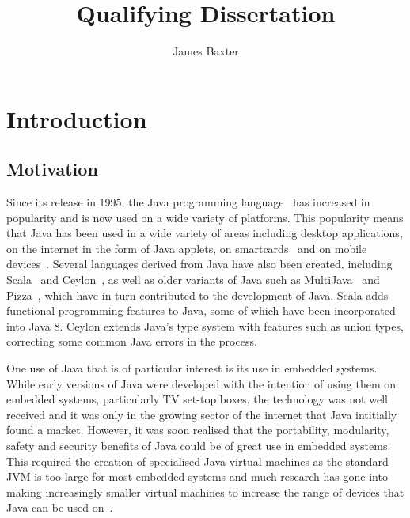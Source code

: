 \documentclass[a4paper,12pt]{article}
\title{Qualifying Dissertation}
\author{James Baxter}
\date{}
\begin{document}
\maketitle

\section{Introduction}


\subsection{Motivation}

Since its release in 1995, the Java programming language~\cite{gosling2013} has
increased in popularity and is now used on a wide variety of platforms.  This
popularity means that Java has been used in a wide variety of areas including
desktop applications, on the internet in the form of Java applets, on
smartcards~\cite{chen2000} and on mobile devices~\cite{oracle2014}.  Several
languages derived from Java have also been created, including
Scala~\cite{lausanne2015} and Ceylon~\cite{redhat2015}, as well as older
variants of Java such as MultiJava~\cite{clifton2006} and
Pizza~\cite{odersky1997}, which have in turn contributed to the development of
Java. Scala adds functional programming features to Java, some of which have
been incorporated into Java 8. Ceylon extends Java's type system with features
such as union types, correcting some common Java errors in the process.

One use of Java that is of particular interest is its use in embedded systems.
While early versions of Java were developed with the intention of using them on
embedded systems, particularly TV set-top boxes, the technology was not well
received and it was only in the growing sector of the internet that Java
intitially found a market. %
However, it was soon realised that the portability, modularity, safety and
security benefits of Java could be of great use in embedded
systems. %
This required the creation of specialised Java virtual machines as the standard
JVM is too large for most embedded systems and much research has gone into
making increasingly smaller virtual machines to increase the range of devices
that Java can be used on~\cite{caska2011,thomm2010}.
\end{document}
